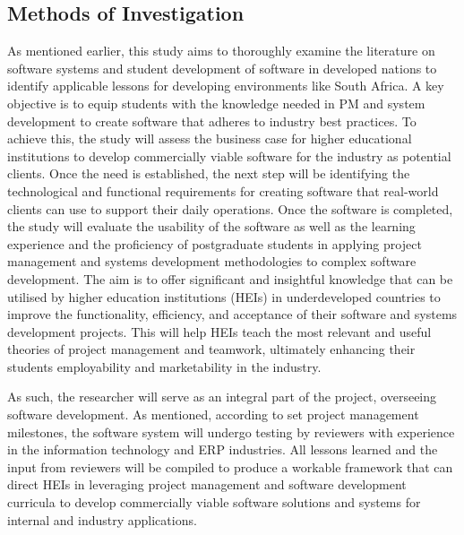 \subsection{Methods of Investigation}
\par{As mentioned earlier, this study aims to thoroughly examine the literature on software systems and student development of software in developed nations to identify applicable lessons for developing environments like South Africa. A key objective is to equip students with the knowledge needed in PM and system development to create software that adheres to industry best practices. To achieve this, the study will assess the business case for higher educational institutions to develop commercially viable software for the industry as potential clients. Once
the need is established, the next step will be identifying the technological and functional requirements for creating software that real-world clients can use to support their daily operations. Once the software is completed, the study will evaluate the usability of the software as well as the learning experience and the proficiency of postgraduate students in applying project management and systems development methodologies to complex software development. The aim is to offer significant and insightful knowledge that can be utilised by higher education institutions (HEIs) in underdeveloped countries to improve the functionality, efficiency, and acceptance of their software and systems development projects. This will help HEIs teach the most relevant and useful theories of project management and teamwork, ultimately enhancing their students employability and marketability in the industry.}
\par{As such, the researcher will serve as an integral part of the project, overseeing software development. As mentioned, according to set project management milestones, the software system will undergo testing by reviewers with experience in the information technology and ERP industries. All lessons learned and the input from reviewers will be compiled to produce a workable framework that can direct HEIs in leveraging project management and software development curricula to develop commercially viable software solutions and systems for internal and industry applications.}

